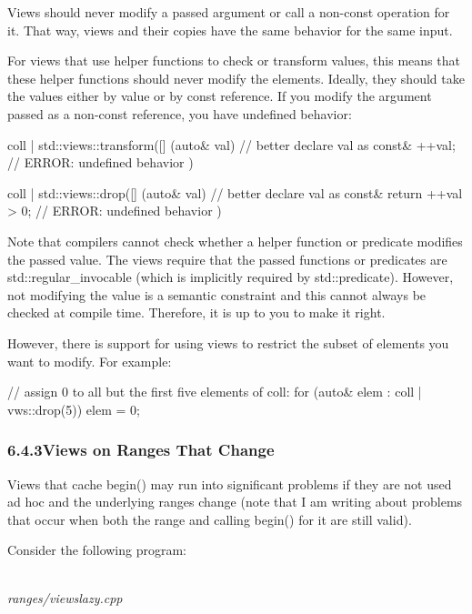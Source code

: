 Views should never modify a passed argument or call a non-const operation for it. That way, views and their copies have the same behavior for the same input.

For views that use helper functions to check or transform values, this means that these helper functions should never modify the elements. Ideally, they should take the values either by value or by const reference. If you modify the argument passed as a non-const reference, you have undefined behavior:

\begin{cpp}
coll | std::views::transform([] (auto& val) { // better declare val as const&
	++val; // ERROR: undefined behavior
})

coll | std::views::drop([] (auto& val) { // better declare val as const&
	return ++val > 0; // ERROR: undefined behavior
})
\end{cpp}

Note that compilers cannot check whether a helper function or predicate modifies the passed value. The views require that the passed functions or predicates are std::regular\_invocable (which is implicitly required by std::predicate). However, not modifying the value is a semantic constraint and this cannot always be checked at compile time. Therefore, it is up to you to make it right.

However, there is support for using views to restrict the subset of elements you want to modify. For example:

\begin{cpp}
// assign 0 to all but the first five elements of coll:
for (auto& elem : coll | vws::drop(5)) {
	elem = 0;
}
\end{cpp}

\subsubsection*{ 6.4.3\hspace{0.2cm}Views on Ranges That Change}

Views that cache begin() may run into significant problems if they are not used ad hoc and the underlying ranges change (note that I am writing about problems that occur when both the range and calling begin() for it are still valid).

Consider the following program:

\noindent
\hspace*{\fill} \\ %
\textit{ranges/viewslazy.cpp}

